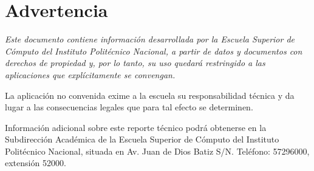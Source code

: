 %
%

\newpage
\thispagestyle{plain}

\vspace*{\fill}
\section*{Advertencia}
\textit{
  Este documento contiene información desarrollada por la Escuela Superior
  de Cómputo del Instituto Politécnico Nacional, a partir de datos y documentos
  con derechos de propiedad y, por lo tanto, su uso quedará restringido a las
  aplicaciones que explícitamente se convengan.}

  La aplicación no convenida exime a la escuela su responsabilidad técnica y
  da lugar a las consecuencias legales que para tal efecto se determinen.

  Información adicional sobre este reporte técnico podrá obtenerse en la
  Subdirección Académica  de la Escuela Superior de Cómputo del Instituto
  Politécnico Nacional, situada en Av. Juan de Dios Batiz S/N. Teléfono:
  57296000, extensión 52000.
\vspace*{\fill}
\newpage
